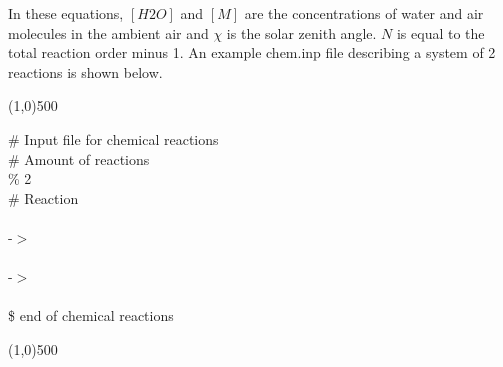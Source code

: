 \documentclass[twoside,11pt,fleqn,a4paper,english,openright]{report}
\begin{document}
				\noindent In these equations, $[H2O]$ and $[M]$ are the concentrations of water and air molecules in the ambient air and $\chi$ is the solar zenith angle. $N$ is equal to the total reaction order minus 1.
An example chem.inp file describing a system of 2 reactions is shown below.
\vspace{15mm}
$\,$\\
\centerline{\line(1,0){500}}
\vspace{15mm}
\addtolength{\leftskip}{-\parindent}
\# Input file for chemical reactions\\
\# Amount of reactions\\
\% 2\\
\# Reaction\\
\makebox[1.5 cm][l]{\#}\\
\makebox[0.5 cm][l]{}-$>$ \\
\makebox[1.5 cm][l]{}\\
\makebox[0.5 cm][l]{}-$>$ \\
\makebox[1.5 cm][l]{}\\
\$ end of chemical reactions\\
\addtolength{\leftskip}{\parindent}
\vspace{15mm}
$\,$\\
\centerline{\line(1,0){500}}
\vspace{15mm}
\end{document}
